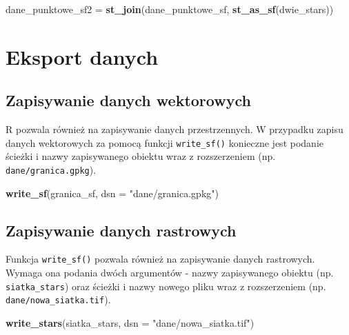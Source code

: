 \documentclass[
  paper=6in:9in,pagesize=pdftex,headinclude=on,footinclude=on,10pt]{scrbook}
\newenvironment{Shaded}{\begin{snugshade}}{\end{snugshade}}
\newcommand{\AttributeTok}[1]{\textcolor[rgb]{0.13,0.29,0.53}{#1}}
\newcommand{\FunctionTok}[1]{\textcolor[rgb]{0.13,0.29,0.53}{\textbf{#1}}}
\newcommand{\NormalTok}[1]{#1}
\newcommand{\OtherTok}[1]{\textcolor[rgb]{0.56,0.35,0.01}{#1}}
\newcommand{\StringTok}[1]{\textcolor[rgb]{0.31,0.60,0.02}{#1}}
\begin{document}
\begin{Shaded}
\begin{Highlighting}[]
\NormalTok{dane\_punktowe\_sf2 }\OtherTok{=} \FunctionTok{st\_join}\NormalTok{(dane\_punktowe\_sf, }\FunctionTok{st\_as\_sf}\NormalTok{(dwie\_stars))}
\end{Highlighting}
\end{Shaded}

\section{Eksport danych}\label{eksport-danych}

\subsection{Zapisywanie danych wektorowych}\label{zapisywanie-danych-wektorowych}

R pozwala również na zapisywanie danych przestrzennych.
W przypadku zapisu danych wektorowych za pomocą funkcji \texttt{write\_sf()} konieczne jest podanie ścieżki i nazwy zapisywanego obiektu wraz z rozszerzeniem (np. \texttt{dane/granica.gpkg}).

\begin{Shaded}
\begin{Highlighting}[]
\FunctionTok{write\_sf}\NormalTok{(granica\_sf, }\AttributeTok{dsn =} \StringTok{"dane/granica.gpkg"}\NormalTok{)}
\end{Highlighting}
\end{Shaded}

\subsection{Zapisywanie danych rastrowych}\label{zapisywanie-danych-rastrowych}

Funkcja \texttt{write\_sf()} pozwala również na zapisywanie danych rastrowych.
Wymaga ona podania dwóch argumentów - nazwy zapisywanego obiektu (np. \texttt{siatka\_stars}) oraz ścieżki i nazwy nowego pliku wraz z rozszerzeniem (np. \texttt{dane/nowa\_siatka.tif}).

\begin{Shaded}
\begin{Highlighting}[]
\FunctionTok{write\_stars}\NormalTok{(siatka\_stars, }\AttributeTok{dsn =} \StringTok{"dane/nowa\_siatka.tif"}\NormalTok{)}
\end{Highlighting}
\end{Shaded}
\end{document}
